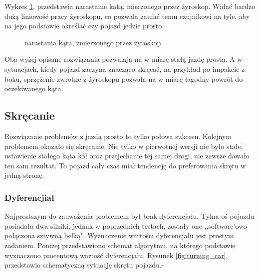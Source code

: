         Wykres \ref{plot:delta_angle_with_gyro}, przedstawia narastanie katą, mierzonego przez żyroskop.
        Widać bardzo dużą liniowość pracy żyroskopu, co pozwala zaufać temu czujnikowi na tyle, aby na jego podstawie określać czy pojazd jedzie prosto.

        \begin{figure}[!ht]
            \centering
                \renewcommand{\figurename}{Wykres}
                \caption{narastania kąta, zmierzonego przez żyroskop}
                \label{plot:delta_angle_with_gyro}
        \end{figure}


    \newpage
    Oba wyżej opisane rozwiązania pozwalają na w miarę stałą jazdę prostą.
    A w sytuacjach, kiedy pojazd zaczyna znacząco skręcać, na przykład po impakcie z boku, sprzężenie zwrotne z żyroskopu pozwala na w miarę łagodny powrót do oczekiwanego kąta.

    \subsection{Skręcanie}
        Rozwiązanie problemów z jazdą prosto to tylko połowa sukcesu.
        Kolejnym problemem okazało się skręcanie. 
        Nie tylko w pierwotnej wersji nie było stałe, ustawienie stałego kąta kół oraz przejechanie tej samej drogi, nie zawsze dawało ten sam rezultat.
        To pojazd cały czas miał tendencję do preferowania skrętu w jedną stronę.
        
        \subsubsection{Dyferencjiał}
        Najprostszym do zauważenia problemem był brak dyferencjału. 
        Tylna oś pojazdu posiadała dwa silniki, jednak w poprzednich testach, zostały one ,,software'owo połączona sztywną belką".
        Wyznaczenie wartości dyferencjału jest prostym zadaniem. Poniżej przedstawiono schemat algorytmu, na którego podstawie wyznaczono procentową wartość dyferencjału.
        Rysunek \ref{fig:turning_car}, przedstawia schematyczną sytuację skrętu pojazdu.-
        

